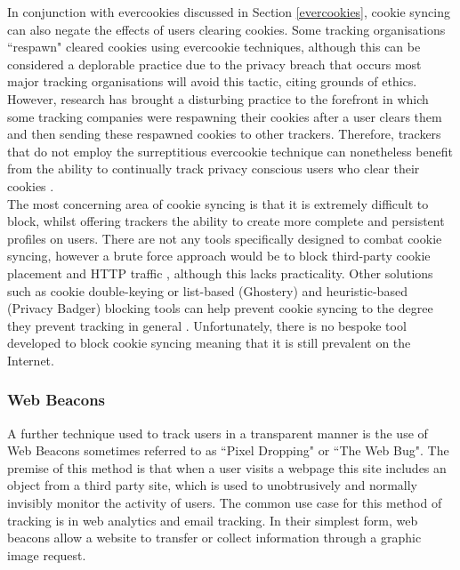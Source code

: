 \documentclass[12pt]{article}
\begin{document}
In conjunction with evercookies discussed in Section \ref{evercookies}, cookie syncing can also negate the effects of users clearing cookies. Some tracking organisations ``respawn" cleared cookies using evercookie techniques, although this can be considered a deplorable practice due to the privacy breach  that occurs most major tracking organisations will avoid this tactic, citing grounds of ethics. However, research has brought a disturbing practice to the forefront in which some tracking companies were respawning their cookies after a user clears them and then sending these respawned cookies to other trackers. Therefore, trackers that do not employ the surreptitious evercookie technique can nonetheless benefit from the ability to continually track privacy conscious users who clear their cookies \parencite{cookieSync}. \\

The most concerning area of cookie syncing is that it is extremely difficult to block, whilst offering trackers the ability to create more complete and persistent profiles on users. There are not any tools specifically designed to combat cookie syncing, however a brute force approach would be to block third-party cookie placement and HTTP traffic \parencite{webNeverForgets}, although this lacks practicality. Other solutions such as cookie double-keying or list-based (Ghostery) and heuristic-based (Privacy Badger) blocking tools can help prevent cookie syncing to the degree they prevent tracking in general \parencite{cookieSync}. Unfortunately, there is no bespoke tool developed to block cookie syncing meaning that it is still prevalent on the Internet.

\subsubsection{Web Beacons}
A further technique used to track users in a transparent manner is the use of Web Beacons sometimes referred to as ``Pixel Dropping" or ``The Web Bug". The premise of this method is that when a user visits a webpage this site includes an object from a third party site, which is used to unobtrusively and normally invisibly monitor the activity of users. The common use case for this method of tracking is in web analytics and email tracking. In their simplest form, web beacons allow a website to transfer or collect information through a graphic image request. \\ 
\end{document}
